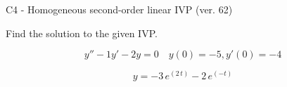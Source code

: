 \begin{exercise}
  \begin{exerciseTitle}C4 - Homogeneous second-order linear IVP (ver. 62)\end{exerciseTitle}
  \begin{exerciseStatement}
    
Find the solution to the given IVP.

    
\[y''-1y'-2y = 0 \hspace{1em} y(0) = -5 , y'(0) = -4\]

  \end{exerciseStatement}
  \begin{exerciseAnswer}
    
\[y= -3 \, e^{\left(2 \, t\right)} - 2 \, e^{\left(-t\right)}\]

  \end{exerciseAnswer}
\end{exercise}